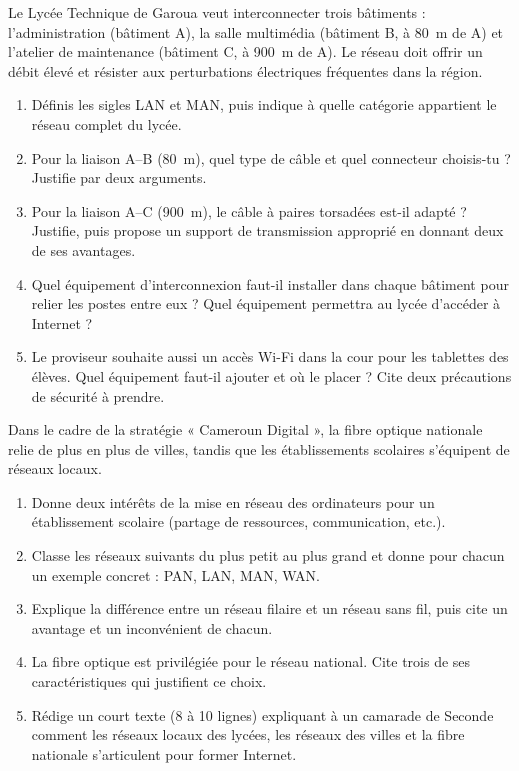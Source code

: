 \documentclass[11pt]{article}
\begin{document}
\begin{exercice}
Le Lycée Technique de Garoua veut interconnecter trois bâtiments : l'administration (bâtiment A), la salle multimédia (bâtiment B, à \SI{80}{m} de A) et l'atelier de maintenance (bâtiment C, à \SI{900}{m} de A). Le réseau doit offrir un débit élevé et résister aux perturbations électriques fréquentes dans la région.
\begin{enumerate}
  \item Définis les sigles LAN et MAN, puis indique à quelle catégorie appartient le réseau complet du lycée.
  \item Pour la liaison A--B (\SI{80}{m}), quel type de câble et quel connecteur choisis-tu ? Justifie par deux arguments.
  \item Pour la liaison A--C (\SI{900}{m}), le câble à paires torsadées est-il adapté ? Justifie, puis propose un support de transmission approprié en donnant deux de ses avantages.
  \item Quel équipement d'interconnexion faut-il installer dans chaque bâtiment pour relier les postes entre eux ? Quel équipement permettra au lycée d'accéder à Internet ?
  \item Le proviseur souhaite aussi un accès Wi-Fi dans la cour pour les tablettes des élèves. Quel équipement faut-il ajouter et où le placer ? Cite deux précautions de sécurité à prendre.
\end{enumerate}
\end{exercice}

\begin{exercice}
Dans le cadre de la stratégie « Cameroun Digital », la fibre optique nationale relie de plus en plus de villes, tandis que les établissements scolaires s'équipent de réseaux locaux.
\begin{enumerate}
  \item Donne deux intérêts de la mise en réseau des ordinateurs pour un établissement scolaire (partage de ressources, communication, etc.).
  \item Classe les réseaux suivants du plus petit au plus grand et donne pour chacun un exemple concret : PAN, LAN, MAN, WAN.
  \item Explique la différence entre un réseau filaire et un réseau sans fil, puis cite un avantage et un inconvénient de chacun.
  \item La fibre optique est privilégiée pour le réseau national. Cite trois de ses caractéristiques qui justifient ce choix.
  \item Rédige un court texte (8 à 10 lignes) expliquant à un camarade de Seconde comment les réseaux locaux des lycées, les réseaux des villes et la fibre nationale s'articulent pour former Internet.
\end{enumerate}
\end{exercice}
\end{document}
